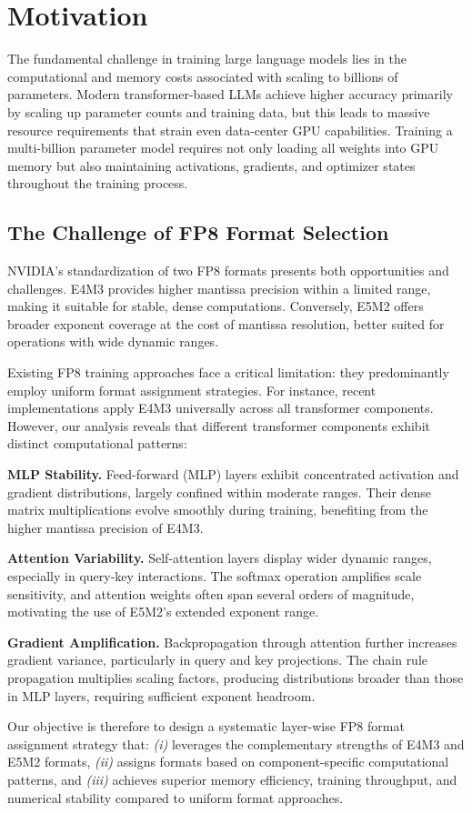 \section{Motivation}\label{sec:motivation}

The fundamental challenge in training large language models lies in the computational and memory costs associated with scaling to billions of parameters. Modern transformer-based LLMs achieve higher accuracy primarily by scaling up parameter counts and training data, but this leads to massive resource requirements that strain even data-center GPU capabilities. Training a multi-billion parameter model requires not only loading all weights into GPU memory but also maintaining activations, gradients, and optimizer states throughout the training process.

\subsection{The Challenge of FP8 Format Selection}

NVIDIA's standardization of two FP8 formats presents both opportunities and challenges. E4M3 provides higher mantissa precision within a limited range, making it suitable for stable, dense computations. Conversely, E5M2 offers broader exponent coverage at the cost of mantissa resolution, better suited for operations with wide dynamic ranges.

Existing FP8 training approaches face a critical limitation: they predominantly employ uniform format assignment strategies. For instance, recent implementations apply E4M3 universally across all transformer components. However, our analysis reveals that different transformer components exhibit distinct computational patterns:

\textbf{MLP Stability.} Feed-forward (MLP) layers exhibit concentrated activation and gradient distributions, largely confined within moderate ranges. Their dense matrix multiplications evolve smoothly during training, benefiting from the higher mantissa precision of E4M3.

\textbf{Attention Variability.} Self-attention layers display wider dynamic ranges, especially in query-key interactions. The softmax operation amplifies scale sensitivity, and attention weights often span several orders of magnitude, motivating the use of E5M2's extended exponent range.

\textbf{Gradient Amplification.} Backpropagation through attention further increases gradient variance, particularly in query and key projections. The chain rule propagation multiplies scaling factors, producing distributions broader than those in MLP layers, requiring sufficient exponent headroom.

Our objective is therefore to design a systematic layer-wise FP8 format assignment strategy that: \emph{(i)} leverages the complementary strengths of E4M3 and E5M2 formats, \emph{(ii)} assigns formats based on component-specific computational patterns, and \emph{(iii)} achieves superior memory efficiency, training throughput, and numerical stability compared to uniform format approaches.
